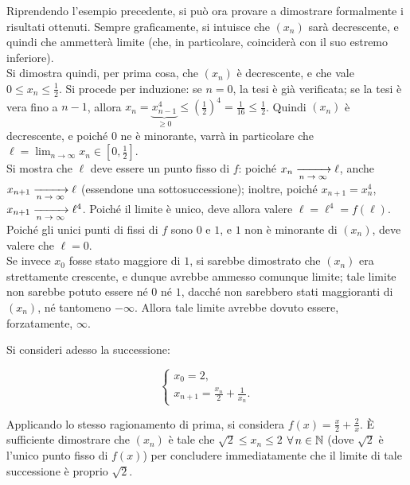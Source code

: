 \documentclass[11pt]{article}
\begin{document}
\begin{example}
    Riprendendo l'esempio precedente, si può ora provare
    a dimostrare formalmente i risultati ottenuti.
    Sempre graficamente, si intuisce che $(x_n)$ sarà
    decrescente, e quindi che ammetterà limite (che,
    in particolare, coinciderà con il suo estremo inferiore). \\

    Si dimostra quindi, per prima cosa, che $(x_n)$ è
    decrescente, e che vale $0 \leq x_n \leq \frac{1}{2}$.
    Si procede per induzione: se $n=0$, la tesi è già
    verificata; se la tesi è vera fino a $n-1$, allora
    $x_n = \underbrace{x_{n-1}^4}_{\geq 0} \leq \left(\frac{1}{2}\right)^4 = \frac{1}{16} \leq \frac{1}{2}$. Quindi
    $(x_n)$ è decrescente, e poiché $0$ ne è minorante,
    varrà in particolare che $\ell = \lim_{n \to \infty} x_n \in [0, \frac{1}{2}]$. \\

    Si mostra che $\ell$ deve essere un punto fisso di
    $f$: poiché $x_n \xrightarrow[\text{$n \to \infty$}]{} \ell$, anche $x_{n+1} \xrightarrow[\text{$n \to \infty$}]{}
    \ell$ (essendone una sottosuccessione); inoltre, poiché
    $x_{n+1} = x_n^4$, $x_{n+1} \xrightarrow[\text{$n \to \infty$}]{} \ell^4$. Poiché il limite è unico, deve allora valere $\ell = \ell^4 = f(\ell)$. Poiché gli unici punti di fissi di $f$ sono
    $0$ e $1$, e $1$ non è
    minorante di $(x_n)$,
    deve valere che $\ell = 0$. \\

    Se invece $x_0$ fosse stato
    maggiore di $1$, si sarebbe
    dimostrato che $(x_n)$ era
    strettamente crescente, e
    dunque avrebbe ammesso comunque
    limite; tale limite non sarebbe
    potuto essere né $0$ né $1$,
    dacché non sarebbero stati maggioranti
    di $(x_n)$, né tantomeno
    $-\infty$. Allora tale limite
    avrebbe dovuto essere,
    forzatamente, $\infty$.
\end{example}

\begin{example}
    Si consideri adesso la
    successione:

    \[ \begin{cases}
        x_0 = 2, \\
        x_{n+1} = \frac{x_n}{2} + \frac{1}{x_n}.
    \end{cases} \]

    Applicando lo stesso ragionamento
    di prima, si considera $f(x) = \frac{x}{2} + \frac{2}{x}$. È sufficiente
    dimostrare che $(x_n)$ è tale che
    $\sqrt{2} \leq x_n \leq 2$
    $\forall n \in \NN$ (dove $\sqrt{2}$
    è l'unico punto fisso di $f(x)$) per
    concludere immediatamente che
    il limite di tale successione è
    proprio $\sqrt{2}$.
\end{example}
\end{document}
